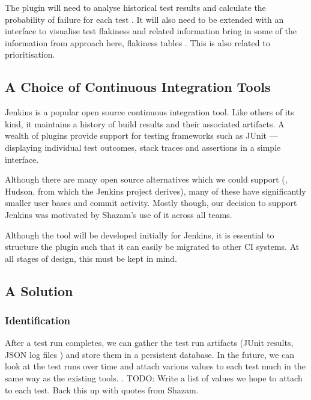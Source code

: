 The plugin will need to analyse historical test results and calculate the probability of failure for each test . It will also need to be extended with an interface to visualise test flakiness and related information {\todo bring in some of the information from approach here, flakiness tables \etc}. This is also related to prioritisation.


\subsection{A Choice of Continuous Integration Tools}

Jenkins \cite{Jenkins} is a popular open source continuous integration tool. Like others of its kind, it maintains a history of build results and their associated artifacts. A wealth of plugins provide support for testing frameworks such as JUnit --- displaying individual test outcomes, stack traces and assertions in a simple interface.

Although there are many open source alternatives which we could support (\eg, Hudson, from which the Jenkins project derives), many of these have significantly smaller user bases and commit activity. Mostly though, our decision to support Jenkins was motivated by Shazam's use of it across all teams.

Although the tool will be developed initially for Jenkins, it is essential to structure the plugin such that it can easily be migrated to other CI systems. At all stages of design, this must be kept in mind.


\subsection{A Solution}

\subsubsection{Identification}

After a test run completes, we can gather the test run artifacts (JUnit results, \heisentest{} JSON log files \etc) and store them in a persistent database. In the future, we can look at the test runs over time and attach various values to each test much in the same way as the existing tools. .
TODO: Write a list of values we hope to attach to each test. Back this up with quotes from Shazam.


